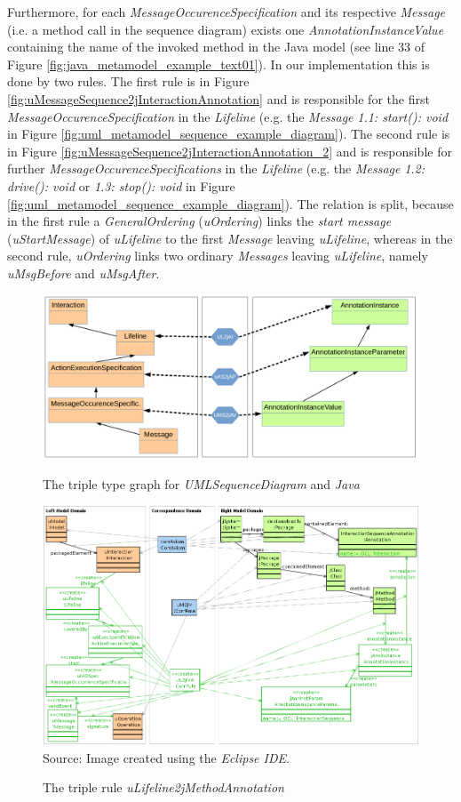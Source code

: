 \documentclass[tuberlin,cic,tc,english,noabntcite,oneside]{iiufrgs}
\begin{document}
Furthermore, for each \emph{MessageOccurenceSpecification} and its respective \emph{Message} (i.e. a method call in the sequence diagram) exists one \emph{AnnotationInstanceValue} containing the name of the invoked method in the Java model (see line 33 of Figure \ref{fig:java_metamodel_example_text01}). In our implementation this is done by two rules. The first rule is in Figure \ref{fig:uMessageSequence2jInteractionAnnotation} and is responsible for the first \emph{MessageOccurenceSpecification} in the \emph{Lifeline} (e.g. the \emph{Message} \emph{1.1: start(): void} in Figure  \ref{fig:uml_metamodel_sequence_example_diagram}). The second rule is in Figure \ref{fig:uMessageSequence2jInteractionAnnotation_2} and is responsible for further \emph{MessageOccurenceSpecifications} in the \emph{Lifeline} (e.g. the \emph{Message} \emph{1.2: drive(): void} or \emph{1.3: stop(): void} in Figure  \ref{fig:uml_metamodel_sequence_example_diagram}). The relation is split, because in the first rule a \emph{GeneralOrdering} (\emph{uOrdering}) links the \emph{start message} (\emph{uStartMessage}) of \emph{uLifeline} to the first \emph{Message} leaving \emph{uLifeline}, whereas in the second rule, \emph{uOrdering} links two ordinary \emph{Messages} leaving \emph{uLifeline}, namely \emph{uMsgBefore} and \emph{uMsgAfter}.

\begin{figure}[H]
	\centering
    \caption{The triple type graph for \emph{UMLSequenceDiagram} and \emph{Java}}
    \includegraphics[width=.7\textwidth]{umlSequenceDiagram2java_type}
    \label{fig:umlSequenceDiagram2java_type}
\end{figure}

\begin{figure}[H]
	\centering
    \caption{The triple rule \emph{uLifeline2jMethodAnnotation}}
    \includegraphics[width=\textwidth]{uILifeline2jMAnnotation} \\
    Source: Image created using the \emph{Eclipse IDE}.
    \label{fig:uILifeline2jMAnnotation}
\end{figure}
\end{document}
